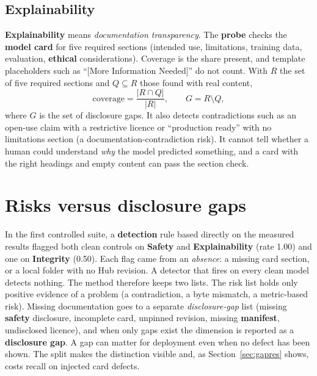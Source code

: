 \subsection{Explainability}
\textbf{Explainability} means \emph{documentation transparency}. The \textbf{probe} checks the \textbf{model card} for five required sections (intended use, limitations, training data, evaluation, \textbf{ethical} considerations). Coverage is the share present, and template placeholders such as ``[More Information Needed]'' do not count. With $R$ the set of five required sections and $Q\subseteq R$ those found with real content,
\begin{equation}
\mathrm{coverage}=\frac{|R\cap Q|}{|R|},\qquad G=R\setminus Q,\label{eq:gapset}
\end{equation}
where $G$ is the set of disclosure gaps. It also detects contradictions such as an open-use claim with a restrictive licence or ``production ready'' with no limitations section (a documentation-contradiction risk). It cannot tell whether a human could understand \emph{why} the model predicted something, and a card with the right headings and empty content can pass the section check.

\section{Risks versus disclosure gaps}\label{sec:gaps}
In the first controlled suite, a \textbf{detection} rule based directly on the measured results flagged both clean controls on \textbf{Safety} and \textbf{Explainability} (rate 1.00) and one on \textbf{Integrity} (0.50). Each flag came from an \emph{absence}: a missing card section, or a local folder with no Hub revision. A detector that fires on every clean model detects nothing. The method therefore keeps two lists. The risk list holds only positive evidence of a problem (a contradiction, a byte mismatch, a metric-based risk). Missing documentation goes to a separate \emph{disclosure-gap} list (missing \textbf{safety} disclosure, incomplete card, unpinned revision, missing \textbf{manifest}, undisclosed licence), and when only gaps exist the dimension is reported as a \textbf{disclosure gap}. A gap can matter for deployment even when no defect has been shown. The split makes the distinction visible and, as Section~\ref{sec:gapres} shows, costs recall on injected card defects.

